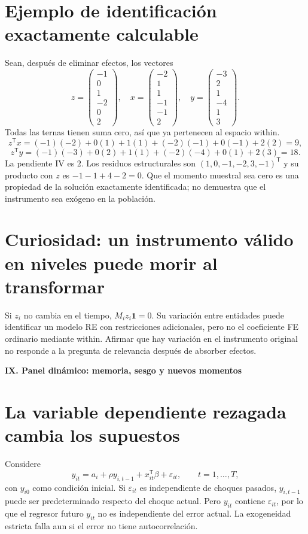 \documentclass[11pt,a4paper]{article}
\newcommand{\T}{^{\mathsf T}}
\newcommand{\ones}{\mathbf 1}
\theoremstyle{definition}
\newcommand{\parte}[1]{\par\bigskip\Needspace{8\baselineskip}\begin{center}{\Large\bfseries\color{azul}#1}\end{center}}
\newcommand{\eps}{\varepsilon}
\begin{document}
\section{Ejemplo de identificación exactamente calculable}
Sean, después de eliminar efectos, los vectores
\[
z=\begin{pmatrix}-1\\0\\1\\-2\\0\\2\end{pmatrix},\quad
x=\begin{pmatrix}-2\\1\\1\\-1\\-1\\2\end{pmatrix},\quad
y=\begin{pmatrix}-3\\2\\1\\-4\\1\\3\end{pmatrix}.
\]
Todas las ternas tienen suma cero, así que ya pertenecen al espacio within.
\[
z\T x=(-1)(-2)+0(1)+1(1)+(-2)(-1)+0(-1)+2(2)=9,
\]
\[
z\T y=(-1)(-3)+0(2)+1(1)+(-2)(-4)+0(1)+2(3)=18.
\]
La pendiente IV es $2$.
Los residuos estructurales son
$(1,0,-1,-2,3,-1)\T$ y su producto con $z$ es
$-1-1+4-2=0$.
Que el momento muestral sea cero es una propiedad de la solución exactamente identificada; no demuestra que el instrumento sea exógeno en la población.

\section{Curiosidad: un instrumento válido en niveles puede morir al transformar}
Si $z_i$ no cambia en el tiempo, $M_iz_i\ones=0$.
Su variación entre entidades puede identificar un modelo RE con restricciones adicionales, pero no el coeficiente FE ordinario mediante within.
Afirmar que hay variación en el instrumento original no responde a la pregunta de relevancia después de absorber efectos.



\parte{IX. Panel dinámico: memoria, sesgo y nuevos momentos}
\section{La variable dependiente rezagada cambia los supuestos}
Considere
\[
y_{it}=a_i+\rho y_{i,t-1}+x_{it}\T\beta+\eps_{it},
\qquad t=1,\ldots,T,
\]
con $y_{i0}$ como condición inicial.
Si $\eps_{it}$ es independiente de choques pasados, $y_{i,t-1}$ puede ser predeterminado respecto del choque actual. Pero $y_{it}$ contiene $\eps_{it}$, por lo que el regresor futuro $y_{it}$ no es independiente del error actual.
La exogeneidad estricta falla aun si el error no tiene autocorrelación.
\end{document}
